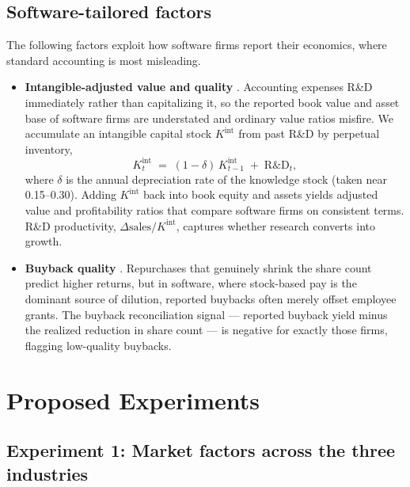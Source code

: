 \documentclass[11pt]{article}
\newcommand{\Kint}{K^{\text{int}}}
\begin{document}
\subsection{Software-tailored factors}

The following factors exploit how software firms report their economics, where standard accounting is most
misleading.

\begin{itemize}
  \item \textbf{Intangible-adjusted value and quality} \citep{petersTaylor2017}.
  Accounting expenses R\&D immediately rather than capitalizing it, so the reported book
  value and asset base of software firms are understated and ordinary value ratios
  misfire. We accumulate an intangible capital stock $\Kint$ from past R\&D by perpetual
  inventory,
  \begin{equation}
    \Kint_t \;=\; (1-\delta)\,\Kint_{t-1} \;+\; \text{R\&D}_t,
  \end{equation}
  where $\delta$ is the annual depreciation rate of the knowledge stock (taken near
  0.15--0.30). Adding $\Kint$ back into book equity and assets yields adjusted value and
  profitability ratios that compare software firms on consistent terms. R\&D productivity,
  $\Delta\text{sales}/\Kint$, captures whether research converts into growth.

  \item \textbf{Buyback quality} \citep{pontiff2008}. Repurchases that genuinely shrink the
  share count predict higher returns, but in software, where stock-based pay is the dominant
  source of dilution, reported buybacks often merely offset employee grants. The buyback
  reconciliation signal --- reported buyback yield minus the realized reduction in share
  count --- is negative for exactly those firms, flagging low-quality buybacks.
\end{itemize}

\section{Proposed Experiments}

\subsection{Experiment 1: Market factors across the three industries}
\end{document}
